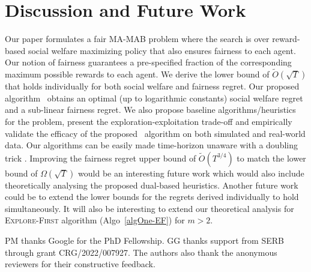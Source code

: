 \section{Discussion and Future Work}
Our paper formulates a fair MA-MAB problem where the search is over reward-based social welfare maximizing policy that also ensures fairness to each agent.
Our notion of fairness guarantees a pre-specified fraction of the corresponding maximum possible rewards to each agent. 
We derive the lower bound of $\tilde{O}(\sqrt{T})$ that holds individually for both social welfare and fairness regret. 
Our proposed algorithm \ouralgo \ obtains an optimal (up to logarithmic constants) social welfare regret and a sub-linear fairness regret. We also propose baseline algorithms/heuristics for the problem, present the exploration-exploitation trade-off and empirically validate the efficacy of the proposed \ouralgo \ algorithm on both simulated and real-world data. Our algorithms can be easily made time-horizon unaware with a doubling trick \cite[Theorem 4]{besson2018doubling}.
Improving the fairness regret upper bound of $\tilde{O}(T^{3/4})$ to match the lower bound of $\Omega(\sqrt{T})$ would be an interesting future work which would also include theoretically analysing the proposed dual-based heuristics.
Another future work could be to extend the lower bounds for the regrets derived individually to hold simultaneously. It will also be interesting to extend our theoretical analysis for \textsc{Explore-First} algorithm (Algo~\ref{algOne-EF}) for $m>2$.

\begin{acks}
PM thanks Google for the PhD Fellowship. GG thanks support from SERB through grant CRG/2022/007927.  The authors also thank the anonymous reviewers for their constructive feedback.
\end{acks}
